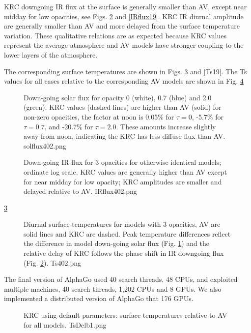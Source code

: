 \documentclass{article}
\begin{document}
KRC downgoing IR flux at the surface is generally smaller than AV, except near midday for low opacities, see Figs. \ref{IRflux402} and \ref{IRflux19}. KRC IR diurnal amplitude are generally smaller than AV and more delayed from the surface temperature variation. These qualitative relations are as expected because KRC values represent the average atmosphere and AV models have stronger coupling to the lower layers of the atmosphere.

The corresponding surface temperatures are shown in Figs. \ref{Ts402} and \ref{Ts19}. The Ts values for all cases relative to the corresponding AV models are shown in Fig. \ref{TsDelb1}

\begin{figure}[!ht] 
\caption[Solar Flux 1]{Down-going solar flux for opacity 0 (white), 0.7 (blue) and 2.0 (green). KRC values (dashed lines) are higher than AV (solid) for non-zero opacities, the factor at noon is 0.05\% for $\tau=0$, -5.7\% for  $\tau=0.7$, and -20.7\% for $\tau=2.0$.  These amounts increase slightly away from noon, indicating the KRC has less diffuse flux than AV.
\label{solflux402} solflux402.png }
\end{figure} 

\begin{figure}[!ht] 
\caption[]{Down-going IR flux for 3 opacities for otherwise identical models; ordinate log scale. KRC values are generally higher than AV except for near midday for low opacity; KRC amplitudes are smaller and delayed relative to AV. 
\label{IRflux402} IRflux402.png }
\end{figure} 

\ref{Ts402}
\begin{figure}[!ht] 
\caption[Surface temperature 1]{Diurnal surface temperatures for models with 3 opacities, AV are solid lines and KRC are dashed. Peak temperature differences reflect the difference in model down-going solar flux (Fig. \ref{solflux402}) and the relative delay of KRC follows the phase shift in IR downgoing flux (Fig.  \ref{IRflux402}).
\label{Ts402} Ts402.png }
\end{figure} 

The final version of AlphaGo used 40 search threads, 48 CPUs, and exploited multiple machines, 40 search threads, 1,202 CPUs and
8 GPUs. We also implemented a distributed version of AlphaGo that 176 GPUs. 


\begin{figure}[!ht] 
\caption[Delta Ts for KRC defaults]{KRC using default parameters: surface temperatures relative to AV for all models.
\label{TsDelb1} TsDelb1.png }
\end{figure} 
\end{document}
